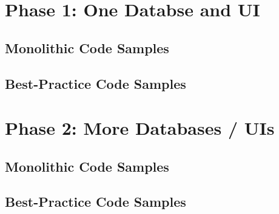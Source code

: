 \clearpage

\section{Phase 1: One Databse and UI}
\subsection{Monolithic Code Samples}

\subsection{Best-Practice Code Samples}

\section{Phase 2: More Databases / UIs}

\subsection{Monolithic Code Samples}

\subsection{Best-Practice Code Samples}
